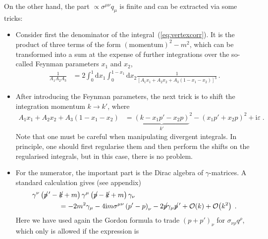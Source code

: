 \documentclass[12pt]{report}
\renewcommand{\slash}[2][4]{\ensuremath{\rlap{\raisebox{1pt}{$\mspace{#1mu}/$}}#2}}
\renewcommand{\d}{\text{d}}
\renewcommand{\i}{\ensuremath{\text{i}}}
\newcommand{\2}{\ensuremath{\sqrt{2}\,}}
\renewcommand{\d}{\ensuremath{\text{d}}}
\begin{document}
{      On the other hand, the part $\propto\! \sigma^{\mu\nu}q_\mu$ is finite and can be extracted
      via some tricks: 
      \begin{itemize}
        \item Consider first the denominator of the integral~(\ref{eq:vertexcorr}). It is the 
          product of three terms 
          of the form $\left(\text{momentum}\right)^2- m^2$, which can be transformed into a  sum at
          the expense of further integrations over the so-called Feynman parameters $x_1$ and $x_2$,
          \begin{align}
            \frac{1}{A_1 A_2 A_3}&=2 \int_0^1 \d x_1 \int_0^{1-x_1} \d x_2 \frac{1}{\left[A_1 x_1
                +A_2 x_2 +A_3 \left(1-x_1-x_2\right) \right]^3}\,.
          \end{align}
        \item After introducing the Feynman parameters, the next trick is to shift the
          integration momentum $k\to k'$, where 
          \begin{align}
            A_1 x_1 +A_2 x_2 +A_3 \left(1-x_1-x_2\right) &= {\underbrace{\left(k-x_1 p' -x_2
              p\right)}_{k'}}^2 -\left(x_1 p' +x_2 p\right)^2 +\i\varepsilon\;.
          \end{align}
          Note that one must be careful when manipulating divergent integrals. In principle, one should
          first regularise them and then perform the shifts on the regularised integrals, but in this
          case, there is no problem.
        \item For the numerator, the important part is the Dirac algebra of $\gamma$-matrices. A
        standard calculation gives (see appendix) 
          \begin{align}
            \begin{split}
              \gamma^\nu &\left(\slash[2]{p}\,'- \slash[2]{k} +m \right) \gamma^\mu \left(\slash[2]{p}-
                \slash[2]{k} +m \right) \gamma_\nu \\
              &\mspace{50mu} = -2 m^2 \gamma_\mu  -4\i m \sigma^{\mu\nu} \left(p'-p\right)_\nu -
              2\slash[2]{p}\gamma_\mu \slash[2]{p}\,' +\mathcal{O}\!\left(k\right)
              +\mathcal{O}\!\left(k^2\right) \;.
            \end{split}
          \end{align}
          Here we have used again the Gordon formula to trade $\left(p+p'\right)_\nu$ for
          $\sigma_{\nu\rho}q^\rho$, which only is allowed if the expression is

\end{itemize}}
\end{document}
